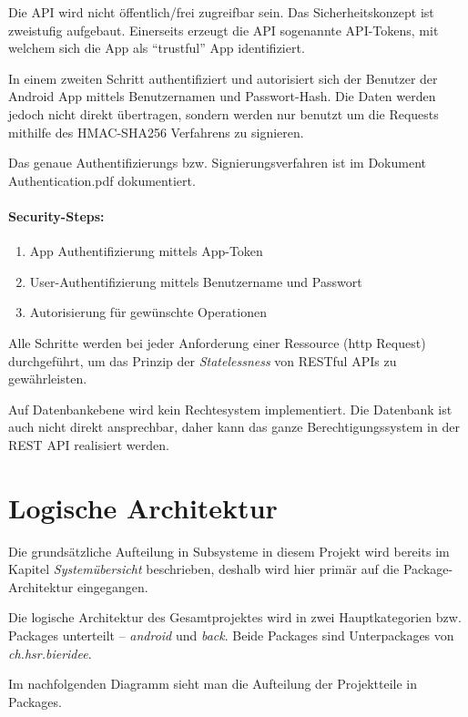 \documentclass[10pt,a4paper]{scrartcl}
\begin{document}
Die API wird nicht öffentlich/frei zugreifbar sein. Das Sicherheitskonzept ist zweistufig aufgebaut.
Einerseits erzeugt die API sogenannte API-Tokens, mit welchem sich die App als "`trustful"' App
identifiziert.

In einem zweiten Schritt authentifiziert und autorisiert sich der Benutzer der Android App mittels
Benutzernamen und Passwort-Hash. Die Daten werden jedoch nicht direkt übertragen, sondern werden nur
benutzt um die Requests mithilfe des HMAC-SHA256 Verfahrens zu signieren.

Das genaue Authentifizierungs bzw. Signierungsverfahren ist im Dokument Authentication.pdf dokumentiert.

\paragraph*{Security-Steps:}

\begin{enumerate}
	\item App Authentifizierung mittels App-Token
	\item User-Authentifizierung mittels Benutzername und Passwort
	\item Autorisierung für gewünschte Operationen
\end{enumerate}
 
Alle Schritte werden bei jeder Anforderung einer Ressource (http Request) durchgeführt, um das
Prinzip der \textit{Statelessness} von RESTful APIs zu gewährleisten.

Auf Datenbankebene wird kein Rechtesystem implementiert. Die Datenbank ist auch nicht direkt
ansprechbar, daher kann das ganze Berechtigungssystem in der REST API realisiert werden.


\section{Logische Architektur}

Die grundsätzliche Aufteilung in Subsysteme in diesem Projekt wird bereits im Kapitel
\textit{Systemübersicht} beschrieben, deshalb wird hier primär auf die Package-Architektur
eingegangen.

Die logische Architektur des Gesamtprojektes wird in zwei Hauptkategorien bzw. Packages unterteilt --
\textit{android} und \textit{back}. Beide Packages sind Unterpackages von
\textit{ch.hsr.bieridee}.

Im nachfolgenden Diagramm sieht man die Aufteilung der Projektteile in Packages.
\end{document}
